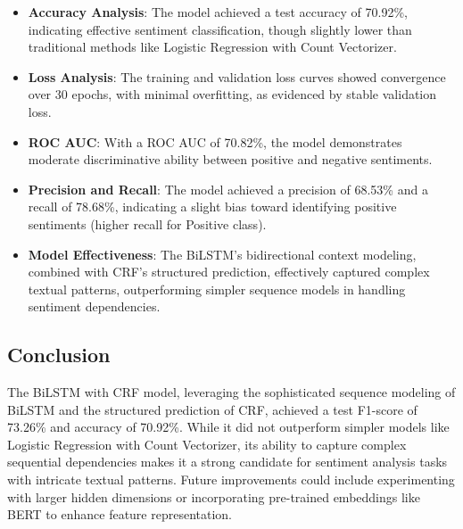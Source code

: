 \begin{itemize}
    \item \textbf{Accuracy Analysis}: The model achieved a test accuracy of 70.92\%, indicating effective sentiment classification, though slightly lower than traditional methods like Logistic Regression with Count Vectorizer.
    \item \textbf{Loss Analysis}: The training and validation loss curves showed convergence over 30 epochs, with minimal overfitting, as evidenced by stable validation loss.
    \item \textbf{ROC AUC}: With a ROC AUC of 70.82\%, the model demonstrates moderate discriminative ability between positive and negative sentiments.
    \item \textbf{Precision and Recall}: The model achieved a precision of 68.53\% and a recall of 78.68\%, indicating a slight bias toward identifying positive sentiments (higher recall for Positive class).
    \item \textbf{Model Effectiveness}: The BiLSTM’s bidirectional context modeling, combined with CRF’s structured prediction, effectively captured complex textual patterns, outperforming simpler sequence models in handling sentiment dependencies.
\end{itemize}

\subsection{Conclusion}

The BiLSTM with CRF model, leveraging the sophisticated sequence modeling of BiLSTM and the structured prediction of CRF, achieved a test F1-score of 73.26\% and accuracy of 70.92\%. While it did not outperform simpler models like Logistic Regression with Count Vectorizer, its ability to capture complex sequential dependencies makes it a strong candidate for sentiment analysis tasks with intricate textual patterns. Future improvements could include experimenting with larger hidden dimensions or incorporating pre-trained embeddings like BERT to enhance feature representation.


